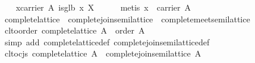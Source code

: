 \begin{isabellebody}
\ \ \isamarkupfalse%
\ {}{}x{}carrier\ A{}\ is{}glb\ x\ X{}\isanewline
\ \ \ \ \isamarkupfalse%
\ {}metis\ {}x\ {}\ carrier\ A{}{}\isanewline
{}\isamarkupfalse%
%
\endisatagproof
{\isafoldproof}%
%
\isadelimproof
%
\endisadelimproof
%
\isamarkuptrue%
\isamarkupfalse%
\ complete{}lattice\ {}\ complete{}join{}semilattice\ {}\ complete{}meet{}semilattice\isanewline
\isanewline
{}\isamarkupfalse%
\ cl{}to{}order{}\ {}complete{}lattice\ A\ {}\ order\ A{}\isanewline
%
\isadelimproof
\ \ %
\endisadelimproof
%
\isatagproof
{}\isamarkupfalse%
\ {}simp\ add{}\ complete{}lattice{}def\ complete{}join{}semilattice{}def{}%
\endisatagproof
{\isafoldproof}%
%
\isadelimproof
\isanewline
%
\endisadelimproof
\isanewline
{}\isamarkupfalse%
\ cl{}to{}cjs{}\ {}complete{}lattice\ A\ {}\ complete{}join{}semilattice\ A{}\isanewline
%
\isadelimproof
\ \ %
\endisadelimproof
%
\isatagproof
{}\isamarkupfalse%

\end{isabellebody}
